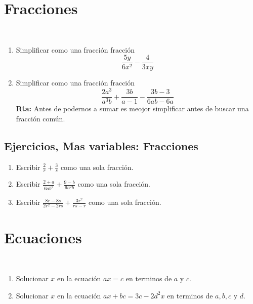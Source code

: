 \section{Fracciones}\label{section_fracciones}
\begin{ejemplo}{\ \\}
	\begin{enumerate}
		\item Simplificar como una fracción fracción
		\[
		\frac{5y}{6x^2} - \frac{4}{3xy}
		\]
		
		\item Simplificar como una fracción fracción
		\[
		\frac{2a^3}{a^3b} + \frac{3b}{a-1} - \frac{3b-3}{6ab-6a}
		\]
		\textbf{Rta: }Antes de podernos a sumar es meojor simplificar antes de buscar una fracción común.
	\end{enumerate}
\end{ejemplo}

\newpage
\begin{center}
	\vspace{-5mm}
	\subsection*{Ejercicios, Mas variables: Fracciones}\label{ejercicios_section_fracciones}
\end{center}

\begin{enumerate}
	\item Escribir $\frac{2}{r} + \frac{3}{s}$ como una sola fracción.
	\item Escribir $\frac{2+a}{6ab^2} + \frac{9-b}{9a^2b}$ como una sola fracción.
	\item Escribir $\frac{8r-8s}{2r^2-2rs} + \frac{3r^2}{rs-r}$ como una sola fracción.		
	
\end{enumerate}
\newpage


\section{Ecuaciones}\label{section_ecuaciones}
\begin{ejemplo}{\ \\}
	\begin{enumerate}
		\item Solucionar $x$ en la ecuación $ax=c$ en terminos de $a$ y $c$.
		
		\item Solucionar $x$ en la ecuación $ax+bc=3c-2d^2x$ en terminos de $a,b,c$ y $d$.
	\end{enumerate}
\end{ejemplo}

